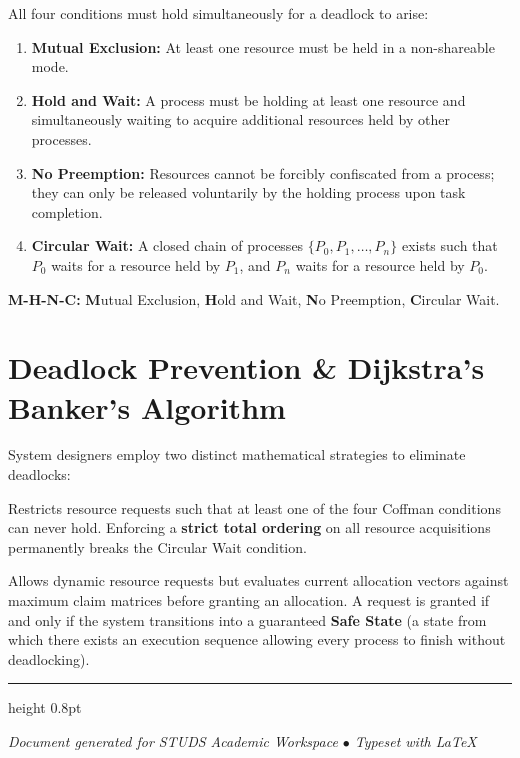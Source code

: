 \documentclass[11pt,a4paper]{article}
\begin{document}
\begin{tcolorbox}[title=The 4 Necessary Coffman Conditions]
All four conditions must hold simultaneously for a deadlock to arise:
\begin{enumerate}[leftmargin=1.5em, itemsep=3pt]
    \item \textbf{Mutual Exclusion:} At least one resource must be held in a non-shareable mode.
    \item \textbf{Hold and Wait:} A process must be holding at least one resource and simultaneously waiting to acquire additional resources held by other processes.
    \item \textbf{No Preemption:} Resources cannot be forcibly confiscated from a process; they can only be released voluntarily by the holding process upon task completion.
    \item \textbf{Circular Wait:} A closed chain of processes $\{P_0, P_1, \dots, P_n\}$ exists such that $P_0$ waits for a resource held by $P_1$, and $P_n$ waits for a resource held by $P_0$.
\end{enumerate}
\end{tcolorbox}

\begin{mnemonicbox}
\textbf{M-H-N-C:} \textbf{M}utual Exclusion, \textbf{H}old and Wait, \textbf{N}o Preemption, \textbf{C}ircular Wait.
\end{mnemonicbox}

\vspace{10pt}

\section{Deadlock Prevention \& Dijkstra's Banker's Algorithm}

System designers employ two distinct mathematical strategies to eliminate deadlocks:

\begin{description}[leftmargin=1.5em, itemsep=4pt]
    \item[\textbf{Deadlock Prevention:}] Restricts resource requests such that at least one of the four Coffman conditions can never hold. Enforcing a \textbf{strict total ordering} on all resource acquisitions permanently breaks the Circular Wait condition.
    \item[\textbf{Deadlock Avoidance (Banker's Algorithm):}] Allows dynamic resource requests but evaluates current allocation vectors against maximum claim matrices before granting an allocation. A request is granted if and only if the system transitions into a guaranteed \textbf{Safe State} (a state from which there exists an execution sequence allowing every process to finish without deadlocking).
\end{description}

\vspace{14pt}
\hrule height 0.8pt
\vspace{8pt}
\begin{center}
    \small \textit{Document generated for STUDS Academic Workspace $\bullet$ Typeset with \LaTeX}
\end{center}
\end{document}
